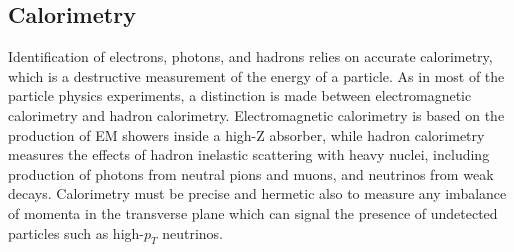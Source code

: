 \subsection{Calorimetry}
Identification of electrons, photons, and hadrons relies on accurate calorimetry,
which is a destructive measurement of the energy of a particle. As in most of
the particle physics experiments, a distinction is made between electromagnetic
calorimetry and hadron calorimetry. Electromagnetic calorimetry is based on the
production of EM showers inside a high-Z absorber, while hadron calorimetry
measures the effects of hadron inelastic scattering with heavy nuclei, including
production of photons from neutral pions and muons, and neutrinos from weak
decays. Calorimetry must be precise and hermetic also to measure any imbalance
of momenta in the transverse plane which can signal the presence of undetected
particles such as high-$p_T$ neutrinos.

